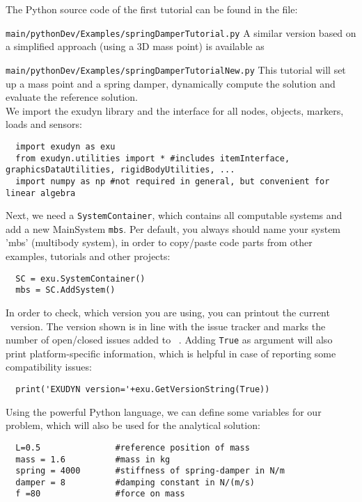 The Python source code of the first tutorial can be found in the file:
\bi
  \item[] \texttt{main/pythonDev/Examples/springDamperTutorial.py}
\ei
A similar version based on a simplified approach (using a 3D mass point) is available as
\bi
  \item[] \texttt{main/pythonDev/Examples/springDamperTutorialNew.py}
\ei
This tutorial will set up a mass point and a spring damper, dynamically compute the solution and evaluate the reference solution.
\vspace{6pt}\\
We import the exudyn library and the interface for all nodes, objects, markers, loads and sensors:
\pythonstyle\begin{lstlisting}
  import exudyn as exu
  from exudyn.utilities import * #includes itemInterface, graphicsDataUtilities, rigidBodyUtilities, ...
  import numpy as np #not required in general, but convenient for linear algebra
\end{lstlisting}
%
Next, we need a \texttt{SystemContainer}, which contains all computable systems and add a new MainSystem \texttt{mbs}.
Per default, you always should name your system 'mbs' (multibody system), in order to copy/paste code parts from other examples, tutorials and other projects:
\pythonstyle\begin{lstlisting}
  SC = exu.SystemContainer()
  mbs = SC.AddSystem()
\end{lstlisting}
%
In order to check, which version you are using, you can printout the current \codeName\ version. 
The version shown is in line with the issue tracker and marks the number of open/closed issues added to \codeName\ .
Adding \texttt{True} as argument will also print platform-specific information, which is helpful 
in case of reporting some compatibility issues:
\pythonstyle\begin{lstlisting}
  print('EXUDYN version='+exu.GetVersionString(True))
\end{lstlisting}
%
Using the powerful Python language, we can define some variables for our problem, which will also be used for the analytical solution:
\pythonstyle\begin{lstlisting}
  L=0.5               #reference position of mass
  mass = 1.6          #mass in kg
  spring = 4000       #stiffness of spring-damper in N/m
  damper = 8          #damping constant in N/(m/s)
  f =80               #force on mass
\end{lstlisting}
